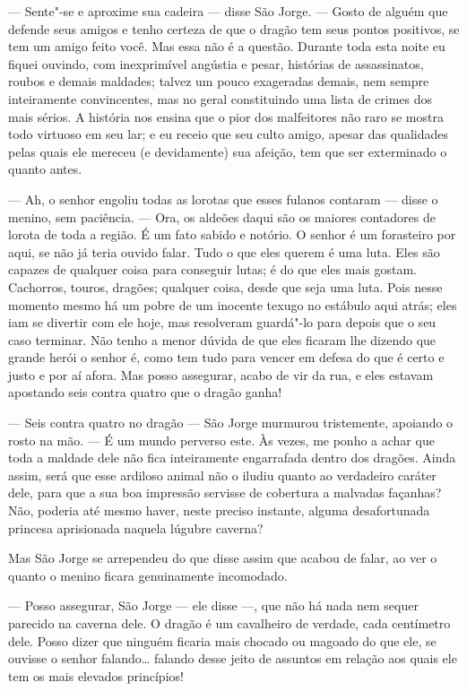 --- Sente"-se e aproxime sua cadeira --- disse São Jorge. --- Gosto de
alguém que defende seus amigos e tenho certeza de que o dragão tem seus
pontos positivos, se tem um amigo feito você. Mas essa não é a
questão. Durante toda esta noite eu fiquei ouvindo, com inexprimível
angústia e pesar, histórias de assassinatos, roubos e demais
maldades; talvez um pouco exageradas demais, nem sempre inteiramente
convincentes, mas no geral constituindo uma lista de crimes dos mais
sérios. A história nos ensina que o pior dos malfeitores não raro se
mostra todo virtuoso em seu lar; e eu receio que seu culto amigo,
apesar das qualidades pelas quais ele mereceu (e devidamente) sua
afeição, tem que ser exterminado o quanto antes.

--- Ah, o senhor engoliu todas as lorotas que esses fulanos contaram
--- disse o menino, sem paciência. --- Ora, os aldeões daqui são
os maiores contadores de lorota de toda a região. É um fato sabido e
notório. O senhor é um forasteiro por aqui, se não já teria ouvido
falar. Tudo o que eles querem é uma luta. Eles são capazes de
qualquer coisa para conseguir lutas; é do que eles mais gostam.
Cachorros, touros, dragões; qualquer coisa, desde que seja uma luta.
Pois nesse momento mesmo há um pobre de um inocente texugo no
estábulo aqui atrás; eles iam se divertir com ele hoje, mas
resolveram guardá"-lo para depois que o seu caso terminar. Não tenho
a menor dúvida de que eles ficaram lhe dizendo que grande herói o senhor
é, como tem tudo para vencer em defesa do que é certo e justo e
por aí afora. Mas posso assegurar, acabo de vir da rua, e eles
estavam apostando seis contra quatro que o dragão ganha!

--- Seis contra quatro no dragão --- São Jorge murmurou tristemente,
apoiando o rosto na mão. --- É um mundo perverso este. Às vezes, me
ponho a achar que toda a maldade dele não fica inteiramente
engarrafada dentro dos dragões. Ainda assim, será que esse ardiloso
animal não o iludiu quanto ao verdadeiro caráter dele, para que a sua
boa impressão servisse de cobertura a malvadas façanhas?
Não, poderia até mesmo haver, neste preciso instante, alguma
desafortunada princesa aprisionada naquela lúgubre caverna?

Mas São Jorge se arrependeu do que disse assim que acabou de falar, ao
ver o quanto o menino ficara genuinamente incomodado.

--- Posso assegurar, São Jorge --- ele disse ---, que não há nada nem
sequer parecido na caverna dele. O dragão é um cavalheiro de verdade,
cada centímetro dele. Posso dizer que ninguém ficaria mais chocado
ou magoado do que ele, se ouvisse o senhor falando\ldots{} falando desse
jeito de assuntos em relação aos quais ele tem os mais elevados
princípios!

